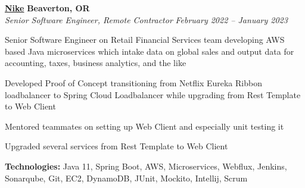 %
    \headerrow
        {\textbf{\href{https://www.nike.com/}{Nike}}}
        {\textbf{Beaverton, OR}}
    \\
    \headerrow
        {\emph{Senior Software Engineer, Remote Contractor}}
        {\emph{February 2022 -- January 2023}}
    \begin{itemize*}
        \item Senior Software Engineer on Retail Financial Services team developing AWS based Java microservices which intake data on global sales and output data for accounting, taxes, business analytics, and the like
        \item Developed Proof of Concept transitioning from Netflix Eureka Ribbon loadbalancer to Spring Cloud Loadbalancer while upgrading from Rest Template to Web Client
        \item Mentored teammates on setting up Web Client and especially unit testing it
        \item Upgraded several services from Rest Template to Web Client
    \end{itemize*}

    \hspace{1.0em}
        {\textbf{Technologies:} Java 11, Spring Boot, AWS, Microservices, Webflux, Jenkins, Sonarqube, Git, EC2, DynamoDB, JUnit, Mockito, Intellij, Scrum}

